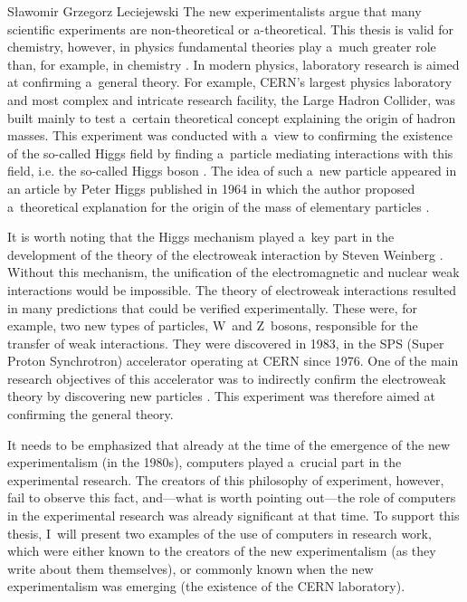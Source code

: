 \begin{artengenv}{Sławomir Grzegorz Leciejewski}
The new experimentalists argue that many scientific experiments are non-theoretical or a-theoretical. This thesis is valid for chemistry, however, in physics fundamental theories play a~much greater role than, for example, in chemistry 
\parencite[][]{zeidler_idea_1995}. %
 In modern physics, laboratory research is aimed at confirming a~general theory. For example, CERN's largest physics laboratory and most complex and intricate research facility, the Large Hadron Collider, was built mainly to test a~certain theoretical concept explaining the origin of hadron masses. This experiment was conducted with a~view to confirming the existence of the so-called Higgs field by finding a~particle mediating interactions with this field, i.e. the so-called Higgs boson 
\parencite[][]{bhat_observation_2013}. %
 The idea of such a~new particle appeared in an article by Peter Higgs published in 1964 in which the author proposed a~theoretical explanation for the origin of the mass of elementary particles 
\parencite[][]{higgs_broken_1964}.%




It is worth noting that the Higgs mechanism played a~key part in the development of the theory of the electroweak interaction by Steven Weinberg 
\parencite*[][]{weinberg_model_1967}. %
 Without this mechanism, the unification of the electromagnetic and nuclear weak interactions would be impossible. The theory of electroweak interactions resulted in many predictions that could be verified experimentally. These were, for example, two new types of particles, W~and Z~bosons, responsible for the transfer of weak interactions. They were discovered in 1983, in the SPS (Super Proton Synchrotron) accelerator operating at CERN since 1976. One of the main research objectives of this accelerator was to indirectly confirm the electroweak theory by discovering new particles 
\parencite[][]{weinberg_dreams_1992}. %
 This experiment was therefore aimed at confirming the general theory.



It needs to be emphasized that already at the time of the emergence of the new experimentalism (in the 1980s), computers played a~crucial part in the experimental research. The creators of this philosophy of experiment, however, fail to observe this fact, and---what is worth pointing out---the role of computers in the experimental research was already significant at that time. To support this thesis, I~will present two examples of the use of computers in research work, which were either known to the creators of the new experimentalism (as they write about them themselves), or commonly known when the new experimentalism was emerging (the existence of the CERN laboratory).




\end{artengenv}
